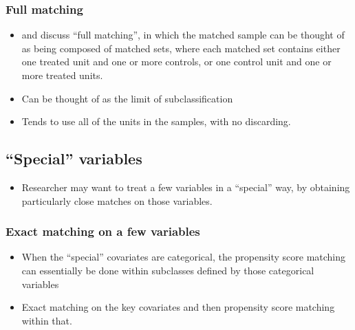 \documentclass[11pt,titlepage]{article}
\begin{document}
\subsubsection{Full matching}
\begin{itemize}
\item \cite{Rosenbaum91a} and \cite{Hansen03} discuss ``full
  matching'', in which the matched sample can be thought of as being
  composed of matched sets, where each matched set contains either one
  treated unit and one or more controls, or one control unit and one
  or more treated units.
\item Can be thought of as the limit of subclassification
\item Tends to use all of the units in the samples, with no
  discarding.
\end{itemize}

\subsection{``Special'' variables}
\begin{itemize} 
\item Researcher may want to treat a few variables in a ``special''
  way, by obtaining particularly close matches on those variables.
\end{itemize}

\subsubsection{Exact matching on a few variables}
\begin{itemize}
\item When the ``special'' covariates are categorical, the propensity
  score matching can essentially be done within subclasses defined by
  those categorical variables
\item Exact matching on the key covariates and then propensity score
  matching within that.
\end{itemize}
\end{document}
